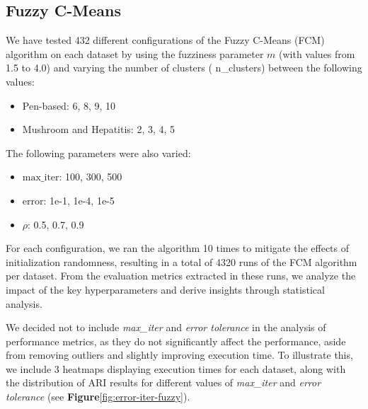
\subsection{Fuzzy C-Means}

We have tested 432 different configurations of the Fuzzy C-Means (FCM) algorithm on each dataset by using the fuzziness parameter \( m \) (with values from 1.5 to 4.0) and varying the number of clusters ( n\_clusters) between the following values:

\begin{itemize}
  \item Pen-based: 6, 8, 9, 10
  \item Mushroom and Hepatitis: 2, 3, 4, 5
\end{itemize}


The following parameters were also varied:


\begin{itemize}
  \item \( \text{max\_iter} \): 100, 300, 500
  \item \( \text{error} \): 1e-1, 1e-4, 1e-5
  \item \( \rho \): 0.5, 0.7, 0.9
\end{itemize}


For each configuration, we ran the algorithm 10 times to mitigate the effects of initialization randomness, resulting in a total of 4320 runs of the FCM algorithm per dataset. From the evaluation metrics extracted in these runs, we analyze the impact of the key hyperparameters and derive insights through statistical analysis.

We decided not to include \textit{max\_iter} and \textit{error tolerance} in the analysis of performance metrics, as they do not significantly affect the performance, aside from removing outliers and slightly improving execution time. To illustrate this, we include 3 heatmaps displaying execution times for each dataset, along with the distribution of ARI results for different values of \textit{max\_iter} and \textit{error tolerance} (see \textbf{Figure}\ref{fig:error-iter-fuzzy}).


